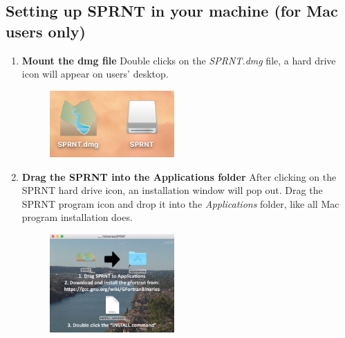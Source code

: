 \documentclass[12pt, letterpaper]{article}
\begin{document}
\newpage
\begin{flushleft}
\section{Setting up SPRNT in your machine (for Mac users only)}
\begin{enumerate}

\item \textbf{Mount the dmg file}\newline
Double clicks on the \emph{SPRNT.dmg} file, a hard drive icon will appear on users' desktop. 
\begin{figure}[H]
	\centering
	\includegraphics[width = 0.45\textwidth]{figure/Mac_installation_1.png} %
	\label{fig:process}%
\end{figure}

\item \textbf{Drag the SPRNT into the Applications folder}\newline
After clicking on the SPRNT hard drive icon, an installation window will pop out. Drag the SPRNT program icon and drop it into the \emph{Applications} folder, like all Mac program installation does.
\begin{figure}[H]
	\centering
	\includegraphics[width = 0.45\textwidth]{figure/Mac_installation_2.png} %
	\label{fig:process}%
\end{figure}


\end{enumerate}
\end{flushleft}
\end{document}
